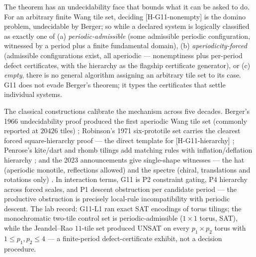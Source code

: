 \documentclass[11pt]{article}
\theoremstyle{definition}
\begin{document}
The theorem has an undecidability face that bounds what it can be asked to do. For an arbitrary
finite Wang tile set, deciding \textup{[H-G11-nonempty]} is the domino problem, undecidable by
Berger; so while a declared system is logically classified as exactly one of (a)
\emph{periodic-admissible} (some admissible periodic configuration, witnessed by a period plus a
finite fundamental domain), (b) \emph{aperiodicity-forced} (admissible configurations exist, all
aperiodic --- nonemptiness plus per-period defect certificates, with the hierarchy as the flagship
certificate generator), or (c) \emph{empty}, there is no general algorithm assigning an arbitrary
tile set to its case. G11 does not evade Berger's theorem; it types the certificates that settle
individual systems.

The classical constructions calibrate the mechanism across five decades. Berger's 1966 undecidability
proof produced the first aperiodic Wang tile set (commonly reported at $20426$ tiles)
\citep{Berger1966}; Robinson's 1971 six-prototile set carries the clearest forced square-hierarchy
proof --- the direct template for \textup{[H-G11-hierarchy]} \citep{Robinson1971}; Penrose's kite/dart
and rhomb tilings add matching rules with inflation/deflation hierarchy \citep{Penrose1974}; and the
2023 announcements give single-shape witnesses --- the hat (aperiodic monotile, reflections allowed)
and the spectre (chiral, translations and rotations only)
\citep{SmithEtAl2023Hat,SmithEtAl2023Spectre}. In interaction terms, G11 is P2 constraint gating, P4
hierarchy across forced scales, and P1 descent obstruction per candidate period --- the productive
obstruction is precisely local-rule incompatibility with periodic descent. The lab record: G11-L1 ran
exact SAT encodings of torus tilings; the monochromatic two-tile control set is periodic-admissible
($1 \times 1$ torus, SAT), while the Jeandel--Rao $11$-tile set produced UNSAT on every $p_1 \times
p_2$ torus with $1 \le p_1, p_2 \le 4$ --- a finite-period defect-certificate exhibit, not a decision
procedure.
\end{document}
